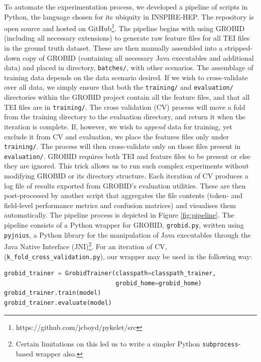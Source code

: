 To automate the experimentation process, we developed a pipeline of scripts in Python, the language chosen for its ubiquity in INSPIRE-HEP. The repository is open source and hosted on GitHub\footnote{https://github.com/jcboyd/pykelet/src}. The pipeline begins with using GROBID (including all necessary extensions) to generate raw feature files for all TEI files in the ground truth dataset. These are then manually assembled into a stripped-down copy of GROBID (containing all necessary Java executables and additional data) and placed in directory, \texttt{batches/}, with other scenarios. The assemblage of training data depends on the data scenario desired. If we wish to cross-validate over all data, we simply ensure that both the \texttt{training/} and \texttt{evaluation/} directories within the GROBID project contain all the feature files, and that all TEI files are in \texttt{training/}. The cross validation (CV) process will move a fold from the training directory to the evaluation directory, and return it when the iteration is complete. If, however, we wish to \emph{append} data for training, yet exclude it from CV and evaluation, we place the features files only under \texttt{training/}. The process will then cross-validate only on those files present in \texttt{evaluation/}. GROBID requires both TEI and feature files to be present or else they are ignored. This trick allows us to run such complex experiments without modifying GROBID or its directory structure. Each iteration of CV produces a log file of results exported from GROBID's evaluation utilities. These are then post-processed by another script that aggregates the file contents (token- and field-level performance metrics and confusion matrices) and visualises them automatically. The pipeline process is depicted in Figure \ref{fig:pipeline}. The pipeline consists of a Python wrapper for GROBID, \texttt{grobid.py}, written using \texttt{pyjnius}, a Python library for the manipulation of Java executables through the Java Native Interface (JNI)\footnote{Certain limitations on this led us to write a simpler Python \texttt{subprocess}-based wrapper also.}. For an iteration of CV, (\texttt{k\_fold\_cross\_validation.py}), our wrapper may be used in the following way:\\

\begin{lstlisting}[language=python, caption=Excerpt from our Python wrapper for GROBID, label={lst:grobid}]
grobid_trainer = GrobidTrainer(classpath=classpath_trainer,
                               grobid_home=grobid_home)
grobid_trainer.train(model)
grobid_trainer.evaluate(model)
\end{lstlisting}

